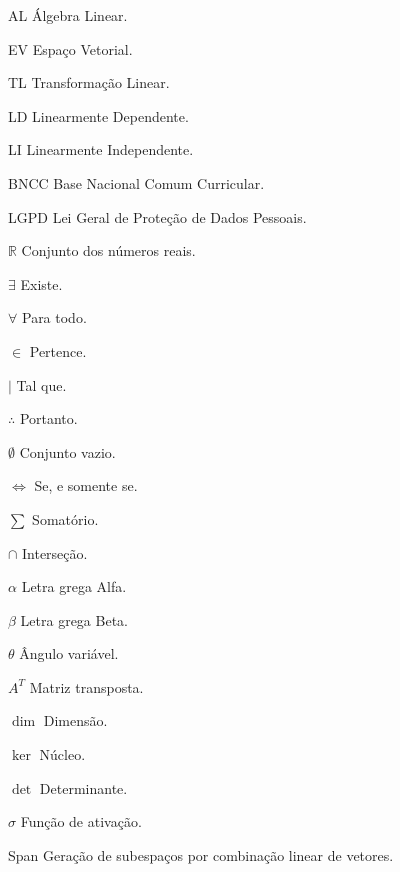\documentclass[
12pt,
 a4paper,
    english,
    brazil,
    oneside
    ]{abntex2}
\begin{document}
	
	\listoffigures*
	\cleardoublepage
	
	
	\listoftables*
	\cleardoublepage
	
	\begin{siglas}
		\item[AL] Álgebra Linear.
		\item[EV] Espaço Vetorial.
		\item[TL] Transformação Linear.
		\item[LD] Linearmente Dependente.
		\item[LI] Linearmente Independente.
		\item[BNCC] Base Nacional Comum Curricular.
		\item[LGPD] Lei Geral de Proteção de Dados Pessoais.
	\end{siglas}
	
	\begin{simbolos}
		\item[$ \mathbb{R} $] Conjunto dos números reais.
		\item[$\exists$] Existe.
		\item[$\forall$] Para todo.
		\item[$\in$] Pertence.
		\item[$\mid$] Tal que.
		\item[$\therefore$] Portanto.
		\item[$\emptyset$] Conjunto vazio.
		\item[$\iff$] Se, e somente se.
		\item[$\sum$] Somatório.
		\item[$\cap$] Interseção.
		\item[$\alpha$] Letra grega Alfa.
		\item[$\beta$] Letra grega Beta.
		\item[$\theta$] Ângulo variável.
		\item[$A^T$] Matriz transposta.
		\item[$\dim$] Dimensão.
		\item[$\ker$] Núcleo.
		\item[$\det$] Determinante.
		\item[$\sigma$] Função de ativação.
		\item[Span] Geração de subespaços por combinação linear de vetores.
	\end{simbolos}
	
\end{document}
